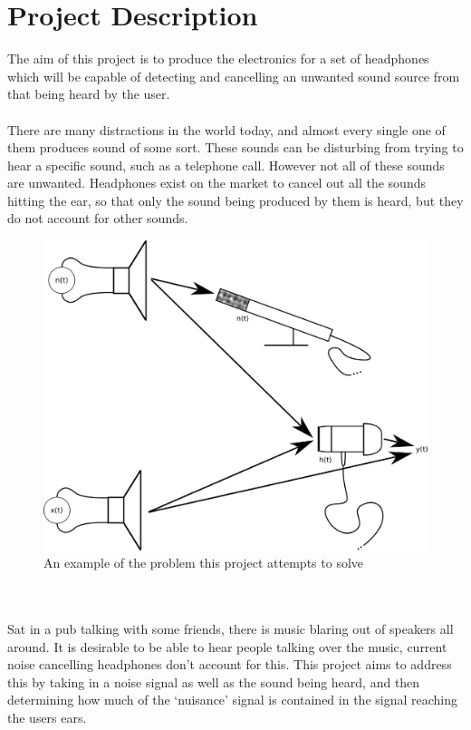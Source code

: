 \section{Project Description}
The aim of this project is to produce the electronics for a set of headphones which will be capable of detecting and cancelling an unwanted sound source from that being heard by the user.
\\
\\
There are many distractions in the world today, and almost every single one of them produces sound of some sort.
These sounds can be disturbing from trying to hear a specific sound, such as a telephone call.
However not all of these sounds are unwanted.
Headphones exist on the market to cancel out all the sounds hitting the ear, so that only the sound being produced by them is heard, but they do not account for other sounds.
\begin{figure}
	\centering
	\includegraphics[width=\textwidth]{./img/projdescript.png}
	\caption{An example of the problem this project attempts to solve}
	\label{fig:projdescript}
\end{figure}
\\
\\
Sat in a pub talking with some friends, there is music blaring out of speakers all around.
It is desirable to be able to hear people talking over the music, current noise cancelling headphones don't account for this.
This project aims to address this by taking in a noise signal as well as the sound being heard, and then determining how much of the `nuisance' signal is contained in the signal reaching the users ears.
